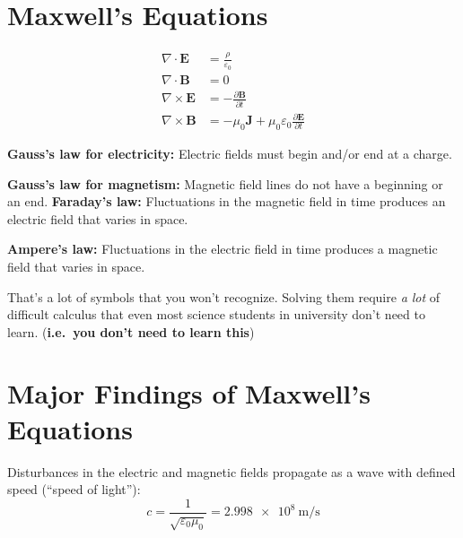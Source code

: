 \section{Maxwell's Equations}
\begin{align*}
  \nabla\cdot\mathbf E &=\frac\rho{\varepsilon_0}\\
  \nabla\cdot\mathbf B &= 0\\
  \nabla\times\mathbf E &=-\frac{\partial\mathbf B}{\partial t}\\
  \nabla\times\mathbf B &=
  -\mu_0\mathbf J+\mu_0\varepsilon_0\frac{\partial\mathbf E}{\partial t}
\end{align*}

\textbf{Gauss's law for electricity:} Electric fields must begin and/or end at
a charge.

%
\textbf{Gauss's law for magnetism:} Magnetic field lines do not have a
beginning or an end.
%
\textbf{Faraday's law:} Fluctuations in the magnetic field in time produces an
electric field that varies in space.

%      
%
\textbf{Ampere's law:} Fluctuations in the electric field in time produces a
magnetic field that varies in space.


That's a lot of symbols that you won't recognize. Solving them require
\emph{a lot} of difficult calculus that even most science students in
university don't need to learn. (\textbf{i.e.\ you don't need to learn this})


\section{Major Findings of Maxwell's Equations}
Disturbances in the electric and magnetic fields propagate as a wave with
defined speed (``speed of light''):
\begin{equation}
  \boxed{
    c=\frac1{\sqrt{\varepsilon_0\mu_0}} = \SI{2.998e8}{\metre\per\second}
  }
\end{equation}

